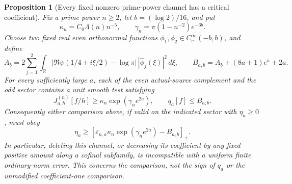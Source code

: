 \documentclass[11pt]{article}
\newtheorem{proposition}[theorem]{Proposition}
\theoremstyle{remark}
\begin{document}
\begin{proposition}[Every fixed nonzero prime-power channel has a critical coefficient]
\label{prop:ns43-fixed-channel}
Fix a prime power $n\ge2$, let $b=(\log2)/16$, and put
\[
 \kappa_n=C_0\Lambda(n)n^{-5},\qquad
 \gamma_n=\pi(1-n^{-2})e^{-6b}.
\]
Choose two fixed real even orthonormal functions
$\phi_1,\phi_2\in C_c^\infty(-b,b)$, and define
\[
 A_b=2\sum_{j=1}^2\int_{\mathbb R}
    |\Re\psi(1/4+i\xi/2)-\log\pi|\,|\widehat\phi_j(\xi)|^2\,d\xi,
 \qquad B_{a,b}=A_b+(8a+1)e^a+2a.
\]
For every sufficiently large $a$, each of the even actual-source
complement and the odd sector contains a unit smooth test satisfying
\[
 J^{(n)}_{a,h}[f/h]\ge\kappa_n\exp(\gamma_n e^{2a}),
 \qquad q_a[f]\le B_{a,b}.
\]
Consequently either comparison above, if valid on the indicated sector
with $\eta_a\ge0$, must obey
\[
 \eta_a\ge
 [\varepsilon_{n,a}\kappa_n\exp(\gamma_n e^{2a})-B_{a,b}]_+.
\]
In particular, deleting this channel, or decreasing its coefficient by
any fixed positive amount along a cofinal subfamily, is incompatible
with a uniform finite ordinary-norm error. This concerns the comparison,
not the sign of $q_a$ or the unmodified coefficient-one comparison.
\end{proposition}
\end{document}
